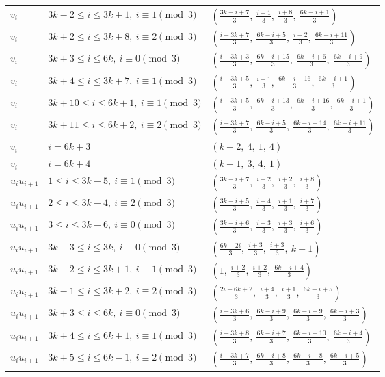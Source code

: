 \begin{longtable}{lll}
$v_i$ & $3k-2 \le i \le 3k+1,\ i \equiv 1 \pmod{3}$ & $(\frac{3k-i+7}{3},\ \frac{i-1}{3},\ \frac{i+8}{3},\ \frac{6k-i+1}{3})$ \\
$v_i$ & $3k+2 \le i \le 3k+8,\ i \equiv 2 \pmod{3}$ & $(\frac{i-3k+7}{3},\ \frac{6k-i+5}{3},\ \frac{i-2}{3},\ \frac{6k-i+11}{3})$ \\
$v_i$ & $3k+3 \le i \le 6k,\ i \equiv 0 \pmod{3}$ & $(\frac{i-3k+3}{3},\ \frac{6k-i+15}{3},\ \frac{6k-i+6}{3},\ \frac{6k-i+9}{3})$ \\
$v_i$ & $3k+4 \le i \le 3k+7,\ i \equiv 1 \pmod{3}$ & $(\frac{i-3k+5}{3},\ \frac{i-1}{3},\ \frac{6k-i+16}{3},\ \frac{6k-i+1}{3})$ \\
$v_i$ & $3k+10 \le i \le 6k+1,\ i \equiv 1 \pmod{3}$ & $(\frac{i-3k+5}{3},\ \frac{6k-i+13}{3},\ \frac{6k-i+16}{3},\ \frac{6k-i+1}{3})$ \\
$v_i$ & $3k+11 \le i \le 6k+2,\ i \equiv 2 \pmod{3}$ & $(\frac{i-3k+7}{3},\ \frac{6k-i+5}{3},\ \frac{6k-i+14}{3},\ \frac{6k-i+11}{3})$ \\
$v_i$ & $i = 6k+3$ & $(k+2,\ 4,\ 1,\ 4)$ \\
$v_i$ & $i = 6k+4$ & $(k+1,\ 3,\ 4,\ 1)$ \\
$u_i u_{i+1}$ & $1 \le i \le 3k-5,\ i \equiv 1 \pmod{3}$ & $(\frac{3k-i+7}{3},\ \frac{i+2}{3},\ \frac{i+2}{3},\ \frac{i+8}{3})$ \\
$u_i u_{i+1}$ & $2 \le i \le 3k-4,\ i \equiv 2 \pmod{3}$ & $(\frac{3k-i+5}{3},\ \frac{i+4}{3},\ \frac{i+1}{3},\ \frac{i+7}{3})$ \\
$u_i u_{i+1}$ & $3 \le i \le 3k-6,\ i \equiv 0 \pmod{3}$ & $(\frac{3k-i+6}{3},\ \frac{i+3}{3},\ \frac{i+3}{3},\ \frac{i+6}{3})$ \\
$u_i u_{i+1}$ & $3k-3 \le i \le 3k,\ i \equiv 0 \pmod{3}$ & $(\frac{6k-2i}{3},\ \frac{i+3}{3},\ \frac{i+3}{3},\ k+1)$ \\
$u_i u_{i+1}$ & $3k-2 \le i \le 3k+1,\ i \equiv 1 \pmod{3}$ & $(1,\ \frac{i+2}{3},\ \frac{i+2}{3},\ \frac{6k-i+4}{3})$ \\
$u_i u_{i+1}$ & $3k-1 \le i \le 3k+2,\ i \equiv 2 \pmod{3}$ & $(\frac{2i-6k+2}{3},\ \frac{i+4}{3},\ \frac{i+1}{3},\ \frac{6k-i+5}{3})$ \\
$u_i u_{i+1}$ & $3k+3 \le i \le 6k,\ i \equiv 0 \pmod{3}$ & $(\frac{i-3k+6}{3},\ \frac{6k-i+9}{3},\ \frac{6k-i+9}{3},\ \frac{6k-i+3}{3})$ \\
$u_i u_{i+1}$ & $3k+4 \le i \le 6k+1,\ i \equiv 1 \pmod{3}$ & $(\frac{i-3k+8}{3},\ \frac{6k-i+7}{3},\ \frac{6k-i+10}{3},\ \frac{6k-i+4}{3})$ \\
$u_i u_{i+1}$ & $3k+5 \le i \le 6k-1,\ i \equiv 2 \pmod{3}$ & $(\frac{i-3k+7}{3},\ \frac{6k-i+8}{3},\ \frac{6k-i+8}{3},\ \frac{6k-i+5}{3})$ \\

\end{longtable}
